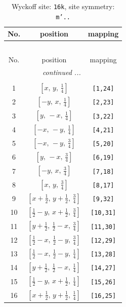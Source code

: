 \documentclass[fleqn,8pt]{jsarticle}
\begin{document}
\renewcommand{\arraystretch}{1.2}
\begin{longtable}{ccc}
\caption{Wyckoff site: {\tt 16k}, site symmetry: {\tt m'..}}
 \\
 \hline \hline
No. & position & mapping \\ \hline \endfirsthead

\multicolumn{2}{l}{\tablename\ \thetable{}} \\
 \hline \hline
No. & position & mapping \\ \hline \endhead

 \hline \hline
\multicolumn{2}{r}{\footnotesize\it continued ...} \\ \endfoot

 \hline \hline
\multicolumn{2}{r}{} \\ \endlastfoot

1 & $\left[ x,\, y,\, \frac{1}{4} \right]$ & {\tt [1,24]} \\ \hline
2 & $\left[ - y,\, x,\, \frac{1}{4} \right]$ & {\tt [2,23]} \\ \hline
3 & $\left[ y,\, - x,\, \frac{1}{4} \right]$ & {\tt [3,22]} \\ \hline
4 & $\left[ - x,\, - y,\, \frac{1}{4} \right]$ & {\tt [4,21]} \\ \hline
5 & $\left[ - x,\, - y,\, \frac{3}{4} \right]$ & {\tt [5,20]} \\ \hline
6 & $\left[ y,\, - x,\, \frac{3}{4} \right]$ & {\tt [6,19]} \\ \hline
7 & $\left[ - y,\, x,\, \frac{3}{4} \right]$ & {\tt [7,18]} \\ \hline
8 & $\left[ x,\, y,\, \frac{3}{4} \right]$ & {\tt [8,17]} \\ \hline
9 & $\left[ x + \frac{1}{2},\, y + \frac{1}{2},\, \frac{3}{4} \right]$ & {\tt [9,32]} \\ \hline
10 & $\left[ \frac{1}{2} - y,\, x + \frac{1}{2},\, \frac{3}{4} \right]$ & {\tt [10,31]} \\ \hline
11 & $\left[ y + \frac{1}{2},\, \frac{1}{2} - x,\, \frac{3}{4} \right]$ & {\tt [11,30]} \\ \hline
12 & $\left[ \frac{1}{2} - x,\, \frac{1}{2} - y,\, \frac{3}{4} \right]$ & {\tt [12,29]} \\ \hline
13 & $\left[ \frac{1}{2} - x,\, \frac{1}{2} - y,\, \frac{1}{4} \right]$ & {\tt [13,28]} \\ \hline
14 & $\left[ y + \frac{1}{2},\, \frac{1}{2} - x,\, \frac{1}{4} \right]$ & {\tt [14,27]} \\ \hline
15 & $\left[ \frac{1}{2} - y,\, x + \frac{1}{2},\, \frac{1}{4} \right]$ & {\tt [15,26]} \\ \hline
16 & $\left[ x + \frac{1}{2},\, y + \frac{1}{2},\, \frac{1}{4} \right]$ & {\tt [16,25]} \\
\end{longtable}
\end{document}
